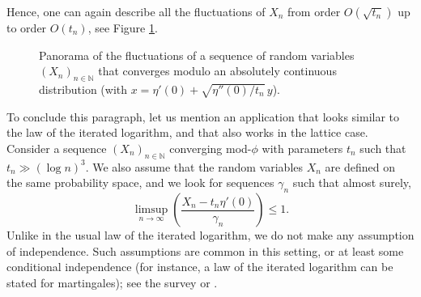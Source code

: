 \documentclass[12pt,a4paper,reqno]{amsart}
\theoremstyle{remark}
\newcommand{\N}{\mathbb{N}}
\newcommand{\R}{\mathbb{R}}
\newcommand{\proba}{\mathbb{P}}
\begin{document}
Hence, one can again describe all the fluctuations of $X_n$ from order $O(\sqrt{t_n})$ up to order $O(t_n)$, see Figure \ref{fig:panoramanonlattice}.
\begin{center}
\begin{figure}[ht]
\caption{Panorama of the fluctuations of a sequence of random variables $(X_n)_{n\in\N}$ that converges modulo an absolutely continuous distribution (with $x=\eta'(0) + \sqrt{\eta''(0)/t_n}\,y$).}\label{fig:panoramanonlattice}
\end{figure}
\end{center}
\vspace{-5mm}

To conclude this paragraph, let us mention an application that looks similar to the law of the iterated logarithm, and that also works in the lattice case. Consider a sequence $(X_n)_{n \in \N}$ converging mod-$\phi$ with parameters $t_n$ such that $t_n \gg (\log n)^3$. We also assume that the random variables $X_{n}$ are defined on the same probability space, and we look for sequences $\gamma_{n}$ such that almost surely,
$$\limsup_{n \to \infty} \left(\frac{X_{n}-t_n \eta'(0)}{\gamma_{n}} \right)\leq 1.$$
Unlike in the usual law of the iterated logarithm, we do not make any assumption of independence. Such assumptions are common in this setting, or at least some conditional independence (for instance, a law of the iterated logarithm can be stated for martingales); see the survey \cite{Bin86} or \cite[Chapter X]{Petrov75}. \bigskip
\end{document}
